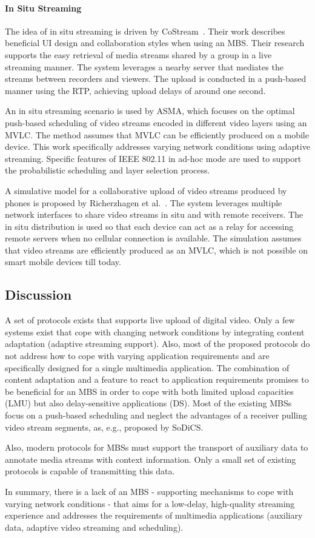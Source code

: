 \paragraph{In Situ Streaming}
The idea of in situ streaming is driven by CoStream~\cite{Dezfuli2013,Dezfuli2012}.
Their work describes beneficial \ac{UI} design and collaboration styles when using an \ac{MBS}.
Their research supports the easy retrieval of media streams shared by a group in a live streaming manner.
The system leverages a nearby server that mediates the streams between recorders and viewers. 
The upload is conducted in a push-based manner using the \ac{RTP}, achieving upload delays of around one second.

An in situ streaming scenario is used by \ac{ASMA}, which focuses on the optimal push-based scheduling of video streams encoded in different video layers using an \ac{MVLC}.
The method assumes that \ac{MVLC} can be efficiently produced on a mobile device. This work specifically addresses varying network conditions using adaptive streaming.
Specific features of IEEE 802.11 in ad-hoc mode are used to support the probabilistic scheduling and layer selection process.

A simulative model for a collaborative upload of video streams produced by phones is proposed by Richerzhagen et al.~\cite{Richerzhagen2016}.
The system leverages multiple network interfaces to share video streams in situ and with remote receivers.
The in situ distribution is used so that each device can act as a relay for accessing remote servers when no cellular connection is available.
The simulation assumes that video streams are efficiently produced as an \ac{MVLC}, which is not possible on smart mobile devices till today.

\subsection{Discussion}
A set of protocols exists that supports live upload of digital video.
Only a few systems exist that cope with changing network conditions by integrating content adaptation (adaptive streaming support). 
Also, most of the proposed protocols do not address how to cope with varying application requirements and are specifically designed for a single multimedia application.
The combination of content adaptation and a feature to react to application requirements promises to be beneficial for an \ac{MBS} in order to cope with both limited upload capacities (LMU) but also delay-sensitive applications (DS).
Most of the existing \ac{MBS}s focus on a push-based scheduling and neglect the advantages of a receiver pulling video stream segments, as, e.g., proposed by SoDiCS.

Also, modern protocols for \ac{MBS}s must support the transport of auxiliary data to annotate media streams with context information.
Only a small set of existing protocols is capable of transmitting this data.

In summary, there is a lack of an \ac{MBS} - supporting mechanisms to cope with varying network conditions - that aims for a low-delay, high-quality streaming experience and addresses the requirements of multimedia applications (auxiliary data, adaptive video streaming and scheduling).